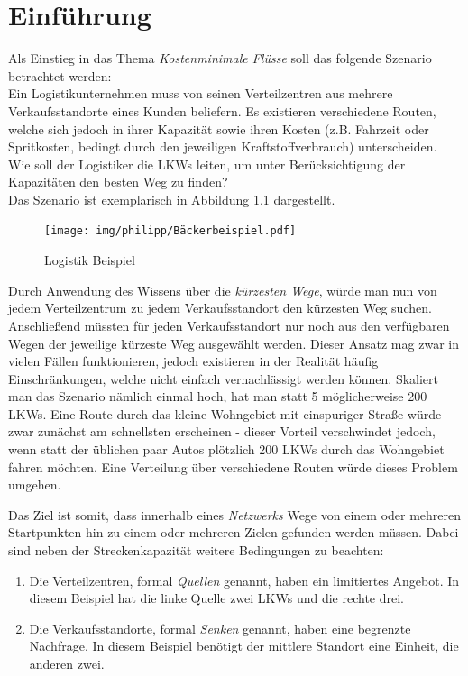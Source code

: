 \newtheorem{definition}{Definition}[section]
\newtheorem{lemma}[definition]{Lemma}

\chapter{Einführung}

Als Einstieg in das Thema \textit{Kostenminimale Flüsse} soll das folgende Szenario betrachtet werden:\\
Ein Logistikunternehmen muss von seinen Verteilzentren aus mehrere Verkaufsstandorte eines Kunden beliefern. Es existieren verschiedene Routen, welche sich jedoch in ihrer Kapazität sowie ihren Kosten (z.B. Fahrzeit oder Spritkosten, bedingt durch den jeweiligen Kraftstoffverbrauch) unterscheiden. Wie soll der Logistiker die LKWs leiten, um unter Berücksichtigung der Kapazitäten den besten Weg zu finden? \\
Das Szenario ist exemplarisch in Abbildung \ref{fig:baeckerbeispiel} dargestellt.

\begin{figure}[htb]
\centering
\texttt{[image: img/philipp/Bäckerbeispiel.pdf]}
\caption{Logistik Beispiel \cite[vgl.][]{buesing2010graphen}}
\label{fig:baeckerbeispiel}
\end{figure}

Durch Anwendung des Wissens über die \textit{kürzesten Wege}, würde man nun von jedem Verteilzentrum zu jedem Verkaufsstandort den kürzesten Weg suchen. Anschließend müssten für jeden Verkaufsstandort nur noch aus den verfügbaren Wegen der jeweilige kürzeste Weg ausgewählt werden. Dieser Ansatz mag zwar in vielen Fällen funktionieren, jedoch existieren in der Realität häufig Einschränkungen, welche nicht einfach vernachlässigt werden können. Skaliert man das Szenario nämlich einmal hoch, hat man statt 5 möglicherweise 200 LKWs. Eine Route durch das kleine Wohngebiet mit einspuriger Straße würde zwar zunächst am schnellsten erscheinen - dieser Vorteil verschwindet jedoch, wenn statt der üblichen paar Autos plötzlich 200 LKWs durch das Wohngebiet fahren möchten. Eine Verteilung über verschiedene Routen würde dieses Problem umgehen.

Das Ziel ist somit, dass innerhalb eines \textit{Netzwerks} Wege von einem oder mehreren Startpunkten hin zu einem oder mehreren Zielen gefunden werden müssen. Dabei sind neben der Streckenkapazität weitere Bedingungen zu beachten:
\begin{enumerate}
    \item Die Verteilzentren, formal \textit{Quellen} genannt, haben ein limitiertes Angebot. In diesem Beispiel hat die linke Quelle zwei LKWs und die rechte drei.
    \item Die Verkaufsstandorte, formal \textit{Senken} genannt, haben eine begrenzte Nachfrage. In diesem Beispiel benötigt der mittlere Standort eine Einheit, die anderen zwei.
\end{enumerate}

